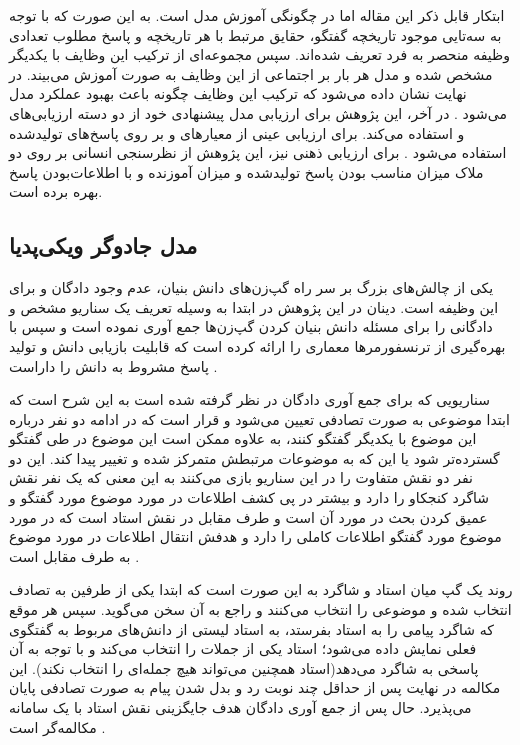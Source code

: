 ابتکار قابل ذکر این مقاله اما در چگونگی آموزش مدل است. به این صورت که با توجه به سه‌تایی موجود تاریخچه گفتگو، حقایق مرتبط با هر تاریخچه و پاسخ مطلوب تعدادی وظیفه منحصر به فرد تعریف شده‌اند. سپس مجموعه‌ای از ترکیب این وظایف با یکدیگر مشخص شده و مدل هر بار بر اجتماعی از این وظایف به صورت 
آموزش می‌بیند. در نهایت نشان داده می‌شود که ترکیب این وظایف چگونه باعث بهبود عملکرد مدل می‌شود
\cite{a_knowledge_grounded}
.
در آخر، این پژوهش برای ارزیابی مدل پیشنهادی خود از دو دسته ارزیابی‌های
و
استفاده می‌کند.
برای ارزیابی عینی از معیار‌های
و
بر روی پاسخ‌های تولیدشده استفاده می‌شود
\cite{papineni-etal-2002-bleu}
. برای ارزیابی ذهنی نیز، این پژوهش از نظرسنجی انسانی بر روی دو ملاک میزان مناسب بودن پاسخ تولیدشده و میزان آموزنده و با اطلاعات‌بودن پاسخ بهره برده است.


\subsection{مدل جادوگر ویکی‌پدیا}\label{chap2:intro:wizard}

یکی از چالش‌های بزرگ بر سر راه گپ‌زن‌های دانش بنیان، عدم وجود دادگان و 
برای این وظیفه است. 
دینان در این پژوهش
در ابتدا به وسیله تعریف یک سناریو مشخص و 
دادگانی را برای مسئله دانش بنیان کردن گپ‌زن‌ها جمع آوری نموده است و سپس با بهره‌گیری از ترنسفورمر‌ها 
معماری را ارائه کرده است که قابلیت بازیابی دانش و تولید پاسخ مشروط به دانش را داراست
\cite{wizard}. 

سناریویی که برای جمع آوری دادگان در نظر گرفته شده است به این شرح است که ابتدا موضوعی به صورت تصادفی تعیین می‌شود و قرار است که در ادامه دو نفر درباره این موضوع با یکدیگر گفتگو کنند، به علاوه ممکن است این موضوع در طی گفتگو گسترده‌تر شود یا این که به موضوعات مرتبطش متمرکز شده و تغییر پیدا کند. این دو نفر دو نقش متفاوت را در این سناریو بازی می‌کنند به این معنی که یک نفر نقش شاگرد کنجکاو را دارد و بیشتر در پی کشف اطلاعات در مورد موضوع مورد گفتگو و عمیق کردن بحث در مورد آن است و طرف مقابل در نقش استاد است که در مورد موضوع مورد گفتگو اطلاعات کاملی را دارد و هدفش انتقال اطلاعات در مورد موضوع به طرف مقابل است
\cite{wizard}.

روند یک گپ‌ میان استاد و شاگرد به این صورت است که ابتدا یکی از طرفین به تصادف انتخاب شده و موضوعی را انتخاب می‌کنند و راجع به آن سخن می‌گوید. سپس هر موقع که شاگرد پیامی را به استاد بفرستد، به استاد لیستی از دانش‌های مربوط به گفتگوی فعلی نمایش‌ داده می‌شود؛ استاد یکی از جملات را انتخاب می‌کند و با توجه به آن پاسخی به شاگرد می‌دهد(استاد همچنین می‌تواند هیچ جمله‌ای را انتخاب نکند).
این مکالمه در نهایت پس از حداقل چند نوبت رد و بدل شدن پیام به صورت تصادفی پایان می‌پذیرد.
حال پس از جمع‌ آوری دادگان هدف جایگزینی نقش استاد با یک سامانه مکالمه‌گر است
\cite{wizard}
.

